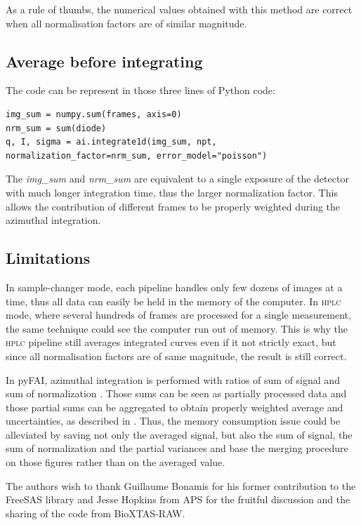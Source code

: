\documentclass[preprint]{iucr}              %
\begin{document}
As a rule of thumbs, the numerical values obtained with this method are correct when all normalisation factors are of similar magnitude.

\subsection{Average before integrating}
The code can be represent in those three lines of Python code:
\begin{verbatim} 
img_sum = numpy.sum(frames, axis=0)
nrm_sum = sum(diode)
q, I, sigma = ai.integrate1d(img_sum, npt, normalization_factor=nrm_sum, error_model="poisson")
\end{verbatim}

The \textit{img\_sum} and \textit{nrm\_sum} are equivalent to a single exposure of the detector with much longer integration time, thus the larger normalization factor. 
This allows the contribution of different frames to be properly weighted during the azimuthal integration. 


\subsection{Limitations}
In sample-changer mode, each pipeline handles only few dozens of images at a time, thus all data can easily be held in the memory of the computer.
In \textsc{hplc} mode, where several hundreds of frames are processed for a single measurement, the same technique could see the computer run out of memory.
This is why the \textsc{hplc} pipeline still averages integrated curves even if it not strictly exact, but since all normalisation factors are of same magnitude, the result is still correct.  

In pyFAI, azimuthal integration is performed with ratios of sum of signal and sum of normalization \cite{pyfai_2020}.
Those sums can be seen as partially processed data and those partial sums can be aggregated to obtain properly weighted average and uncertainties, as described in .
Thus, the memory consumption issue could be alleviated by saving not only the averaged signal, but also the sum of signal, the sum of normalization and the partial variances and base the merging procedure on those figures rather than on the averaged value.

The authors wish to thank Guillaume Bonamis for his former contribution to the FreeSAS library and Jesse Hopkins from APS for the fruitful discussion and the  sharing of the code from BioXTAS-RAW.



\end{document}
